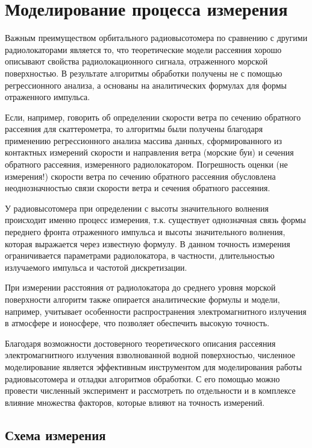 
\section{Моделирование процесса измерения}

Важным преимуществом орбитального радиовысотомера по сравнению с другими
радиолокаторами является то, что теоретические модели рассеяния хорошо
описывают свойства радиолокационного сигнала, отраженного морской поверхностью.
В результате алгоритмы обработки получены не с помощью регрессионного анализа,
а основаны на аналитических формулах для формы отраженного импульса.

Если, например, говорить об определении скорости ветра по сечению обратного
рассеяния для скаттерометра, то алгоритмы были получены благодаря применению
регрессионного анализа массива данных, сформированного из контактных измерений
скорости и направления ветра (морские буи) и сечения обратного рассеяния,
измеренного радиолокатором. Погрешность оценки (не измерения!) скорости ветра
по сечению обратного рассеяния обусловлена неоднозначностью связи скорости
ветра и сечения обратного рассеяния.

У радиовысотомера при определении с высоты значительного волнения происходит
именно процесс измерения, т.к. существует однозначная связь формы переднего
фронта отраженного импульса и высоты значительного волнения, которая выражается
через известную формулу. В данном точность измерения ограничивается параметрами
радиолокатора, в частности, длительностью излучаемого импульса и частотой
дискретизации.

При измерении расстояния от радиолокатора до среднего уровня морской
поверхности алгоритм также опирается аналитические формулы и модели, например,
учитывает особенности распространения электромагнитного излучения в атмосфере и
ионосфере, что позволяет обеспечить высокую точность.

Благодаря возможности достоверного теоретического  описания рассеяния
электромагнитного излучения взволнованной водной поверхностью, численное
моделирование является эффективным инструментом для моделирования работы
радиовысотомера и отладки алгоритмов обработки. С его помощью можно провести
численный эксперимент и рассмотреть по отдельности и в комплексе влияние
множества факторов, которые влияют на точность измерений.

\subsection{Схема измерения}%
\label{sub:skhema_izmereniia}

